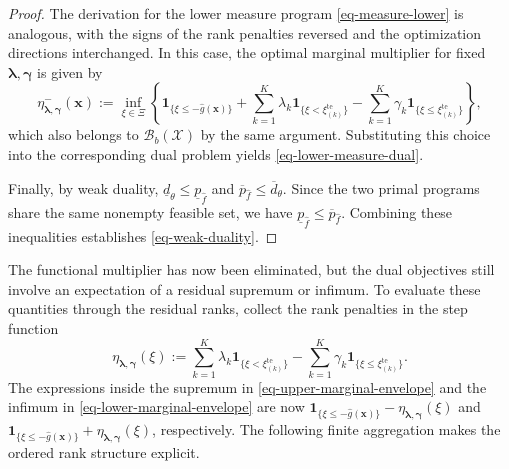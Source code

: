 \documentclass[review,11pt,3p,authoryear,nopreprintline]{elsarticle}
\begin{document}
\begin{proof}
  The derivation for the lower measure program \eqref{eq-measure-lower} is analogous, with the signs of the rank penalties reversed and the optimization directions interchanged. In this case, the optimal marginal multiplier for fixed $\bm\lambda,\bm\gamma$ is given by
  \begin{equation}
    \eta^-_{\bm\lambda,\bm\gamma}(\bm x)
    :=\inf_{\xi\in\Xi}\left\{
      \mathbf1_{\{\xi\le-\hat g(\bm x)\}}
      +\sum_{k=1}^K\lambda_k\mathbf1_{\{\xi<\xi_{(k)}^{\mathrm{te}}\}}
      -\sum_{k=1}^K\gamma_k\mathbf1_{\{\xi\le\xi_{(k)}^{\mathrm{te}}\}}
    \right\},
    \label{eq-lower-marginal-envelope}
  \end{equation}
  which also belongs to $\mathcal B_b(\mathcal X)$ by the same argument. Substituting this choice into the corresponding dual problem yields \eqref{eq-lower-measure-dual}.

  Finally, by weak duality, $\underline d_\theta\le\underline p_{\hat f}$ and $\overline p_{\hat f}\le\overline d_\theta$. Since the two primal programs share the same nonempty feasible set, we have $\underline p_{\hat f}\le\overline p_{\hat f}$. Combining these inequalities establishes \eqref{eq-weak-duality}.
\end{proof}

The functional multiplier has now been eliminated, but the dual objectives still involve an expectation of a residual supremum or infimum. To evaluate these quantities through the residual ranks, collect the rank penalties in the step function
\begin{equation}
  \eta_{\bm\lambda,\bm\gamma}(\xi)
  :=\sum_{k=1}^K\lambda_k\mathbf1_{\{\xi<\xi_{(k)}^{\mathrm{te}}\}}
    -\sum_{k=1}^K\gamma_k\mathbf1_{\{\xi\le\xi_{(k)}^{\mathrm{te}}\}}.
  \label{eq-dual-step-function}
\end{equation}
The expressions inside the supremum in \eqref{eq-upper-marginal-envelope} and the infimum in \eqref{eq-lower-marginal-envelope} are now $\mathbf1_{\{\xi\le-\hat g(\bm x)\}}-\eta_{\bm\lambda,\bm\gamma}(\xi)$ and $\mathbf1_{\{\xi\le-\hat g(\bm x)\}}+\eta_{\bm\lambda,\bm\gamma}(\xi)$, respectively. The following finite aggregation makes the ordered rank structure explicit.
\end{document}
